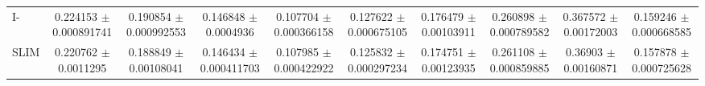 \begin{table}
{\begin{tabular}{l|cccc|cccc|c}
		I-\LinearLow&\num{0.224153} $\pm$ \num{0.000891741}&\num{0.190854} $\pm$ \num{0.000992553}&\num{0.146848} $\pm$ \num{0.0004936}&\num{0.107704} $\pm$ \num{0.000366158}&\num{0.127622} $\pm$ \num{0.000675105}&\num{0.176479} $\pm$ \num{0.00103911}&\num{0.260898} $\pm$ \num{0.000789582}&\num{0.367572} $\pm$ \num{0.00172003}&\num{0.159246} $\pm$ \num{0.000668585}\\
		
		SLIM & \num{0.220762} $\pm$ \num{0.0011295}&\num{0.188849} $\pm$ \num{0.00108041}&\num{0.146434} $\pm$ \num{0.000411703}&\num{0.107985} $\pm$ \num{0.000422922}&\num{0.125832} $\pm$ \num{0.000297234}&\num{0.174751} $\pm$ \num{0.00123935}&\num{0.261108} $\pm$ \num{0.000859885}&\num{0.36903} $\pm$ \num{0.00160871}&\num{0.157878} $\pm$ \num{0.000725628}\\
		\hline
	\end{tabular}
}

\end{table}


